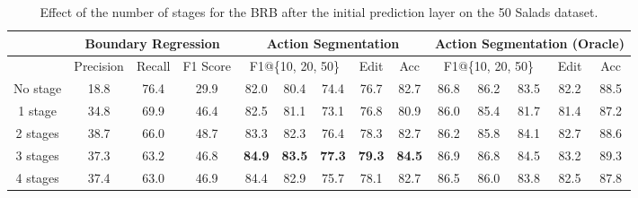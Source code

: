 \documentclass[10pt,twocolumn,letterpaper]{article}
\begin{document}
\begin{table*}[t!]
\small
\centering
\begin{tabular}{cccc|ccccc|ccccc}
\hline
                    & \multicolumn{3}{c}{Boundary Regression}  & \multicolumn{5}{c}{Action Segmentation}             & \multicolumn{5}{c}{Action Segmentation (Oracle)}\\ \hline
                    & Precision      & Recall      & F1 Score  & \multicolumn{3}{c}{F1@\{10, 20, 50\}} & Edit & Acc  & \multicolumn{3}{c}{F1@\{10, 20, 50\}} & Edit & Acc\\ \hline
No stage            & 18.8  & 76.4   & 29.9 & 82.0         & 80.4          & 74.4          & 76.7          & 82.7           & 86.8   & 86.2   & 83.5   & 82.2   & 88.5 \\
1 stage            & 34.8  & 69.9   & 46.4 & 82.5          & 81.1          & 73.1          & 76.8          & 80.9           & 86.0   & 85.4   & 81.7   & 81.4   & 87.2 \\
2 stages            & 38.7  & 66.0   & 48.7 & 83.3          & 82.3          & 76.4          & 78.3          & 82.7           & 86.2   & 85.8   & 84.1   & 82.7   & 88.6 \\
3 stages            & 37.3  & 63.2   & 46.8 & \textbf{84.9} & \textbf{83.5} & \textbf{77.3} & \textbf{79.3} & \textbf{84.5}  & 86.9   & 86.8   & 84.5   & 83.2   & 89.3 \\
4 stages            & 37.4  & 63.0   & 46.9 & 84.4          & 82.9          & 75.7          & 78.1          & 82.7           & 86.5   & 86.0   & 83.8   & 82.5   & 87.8 \\ \hline
\end{tabular}
\caption{Effect of the number of stages for the BRB after the initial prediction layer on the 50 Salads dataset.}
\label{tab:num_stages}
\vspace{-5pt}
\end{table*}
\end{document}
